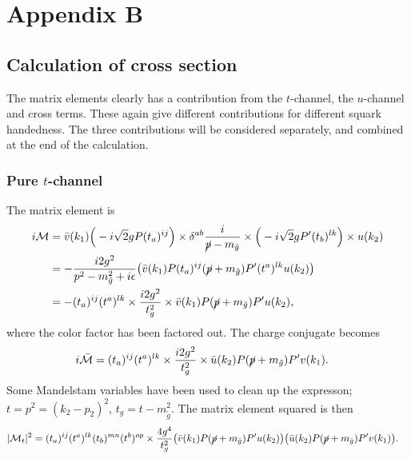 \documentclass[11pt]{article}
\begin{document}
\section*{Appendix B}
\subsection*{Calculation of cross section}

\begin{flushleft}
The matrix elements clearly has a contribution from the $t$-channel, the $u$-channel and cross terms. These again give different contributions for different squark handedness. The three contributions will be considered separately, and combined at the end of the calculation.
\end{flushleft}
\subsubsection*{Pure $t$-channel}
\begin{flushleft}
The matrix element is
\begin{align*}
i \mathcal{M} &= \bar{v} (k_1) \Big( -i \sqrt{2} g P (t_a)^{ij}\Big) \times \delta^{ab} \frac{i}{\cancel{p} - m_{\tilde{g}}} \times \Big( -i \sqrt{2} gP'(t_b)^{lk} \Big) \times u(k_2)\\
&= - \frac{i 2 g^2}{p^2 - m_{\tilde{g}}^2 + i \epsilon}\big( \bar{v} (k_1)  P (t_a)^{ij}(\cancel{p} + m_{\tilde{g}}) P'(t^a)^{lk} u(k_2) \big)\\
&= - (t_a)^{ij}(t^a)^{lk} \times \frac{i 2 g^2}{t_g^2} \times  \bar{v} (k_1)  P (\cancel{p} + m_{\tilde{g}}) P' u(k_2) ,
\end{align*}
where the color factor has been factored out. The charge conjugate becomes
\begin{align*}
i \mathcal{\bar{M}} & = (t_a)^{ij}(t^a)^{lk} \times \frac{i 2 g^2}{t_g^2} \times \bar{u} (k_2)  P (\cancel{p} + m_{\tilde{g}}) P' v(k_1) .
\end{align*}
Some Mandelstam variables have been used to clean up the expresson; $t= p^2 = (k_2 - p_2)^2$, $t_g = t - m_{\tilde{g}}^2$. The matrix element squared is then
\begin{align*}
|\mathcal{M}_t|^2 &=  (t_a)^{ij} (t^a)^{lk} (t_b)^{mn} (t^b)^{op} \times \frac{4 g^4}{t_g^2}
\big( \bar{v} (k_1)  P (\cancel{p} + m_{\tilde{g}}) P' u(k_2) \big)
\big( \bar{u} (k_2)  P (\cancel{p} + m_{\tilde{g}}) P' v(k_1) \big).
\end{align*}
\end{flushleft}
\end{document}
